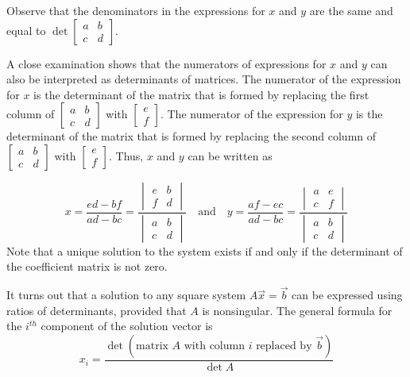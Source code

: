 \documentclass{ximera}
\begin{document}
 Observe that the denominators in the expressions for $x$ and $y$ are the same and equal to $\det{\begin{bmatrix}a&b\\c&d\end{bmatrix}}$.
 
 A close examination shows that the numerators of expressions for $x$ and $y$ can also be interpreted as determinants of matrices. The numerator of the expression for $x$ is the determinant of the matrix that is formed by replacing the first column of $\begin{bmatrix}a&b\\c&d\end{bmatrix}$ with $\begin{bmatrix}e\\f\end{bmatrix}$.  The numerator of the expression for $y$ is the determinant of the matrix that is formed by replacing the second column of $\begin{bmatrix}a&b\\c&d\end{bmatrix}$ with $\begin{bmatrix}e\\f\end{bmatrix}$.  Thus, $x$ and $y$ can be written as
 
 $$x=\frac{ed-bf}{ad-bc}=\frac{\begin{vmatrix}e&b\\f&d\end{vmatrix}}{\begin{vmatrix}a&b\\c&d\end{vmatrix}}\quad\text{and}\quad y=\frac{af-ec}{ad-bc}=\frac{\begin{vmatrix}a&e\\c&f\end{vmatrix}}{\begin{vmatrix}a&b\\c&d\end{vmatrix}}$$
Note that a unique solution to the system exists if and only if the determinant of the coefficient matrix is not zero.

It turns out that a solution to any square system $A\vec{x}=\vec{b}$ can be expressed using ratios of determinants, provided that $A$ is nonsingular.  The general formula for the $i^{th}$ component of the solution vector is
$$x_i=\frac{\det{(\text{matrix } A \text{ with column } i \text{ replaced by } \vec{b})}}{\det{A}}$$
\end{document}
